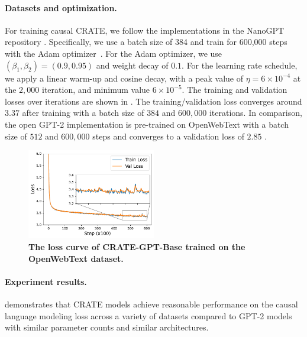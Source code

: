 \documentclass[../../book-main.tex]{subfiles}
\begin{document}
\paragraph{Datasets and optimization.} For training causal CRATE, we follow the implementations in the NanoGPT repository \citep{nanogpt}. Specifically, we use a batch size of 384 and train for 600,000 steps with the Adam optimizer~\citep{kingma2014adam}. For the Adam optimizer, we use $(\beta_1, \beta_2)=(0.9, 0.95)$ and weight decay of $0.1$. For the learning rate schedule, we apply a linear warm-up and cosine decay, with a peak value of $\eta=6\times 10^{-4}$ at the $2,000$ iteration, and minimum value $6\times 10^{-5}$. The training and validation losses over iterations are shown in . The training/validation loss converges around $3.37$ after training with a batch size of $384$ and $600,000$ iterations. In comparison, the open GPT-2 implementation is pre-trained on OpenWebText with a batch size of $512$ and $600,000$ steps and converges to a validation loss of $2.85$ \citep{nanogpt}.  

\begin{figure}
    \centering
    \includegraphics[width=0.5\textwidth]{chapters/chapter7/figs/gpt-loss.pdf}
    \caption{\bf The loss curve of CRATE-GPT-Base trained on the OpenWebText dataset.}
    \label{fig:crate-text-evals}
\end{figure}

\paragraph{Experiment results.}

 demonstrates that CRATE models achieve reasonable performance on the causal language modeling loss across a variety of datasets compared to GPT-2 models with similar parameter counts and similar architectures.
\end{document}
